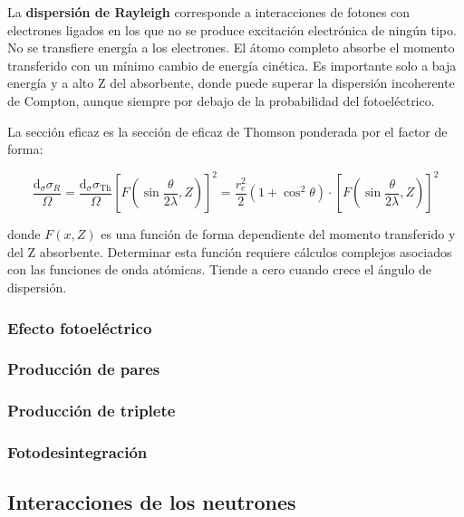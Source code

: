 La \textbf{dispersión de Rayleigh} corresponde a interacciones de fotones con electrones ligados en los que no se produce excitación electrónica de ningún tipo. No se transfiere energía a los electrones. El átomo completo absorbe el momento transferido con un mínimo cambio de energía cinética. Es importante solo a baja energía y a alto Z del absorbente, donde puede superar la dispersión incoherente de Compton, aunque siempre por debajo de la probabilidad del fotoeléctrico. 

La sección eficaz es la sección de eficaz de Thomson ponderada por el factor de forma: 

\begin{equation}
\frac{\mathrm{d}_\sigma \sigma_R}{\Omega} = \frac{\mathrm{d}_\sigma \sigma_{\text{Th}}}{\Omega} \left[ F\left( \sin\frac{\theta}{2\lambda}, Z \right) \right]^2 = \frac{r_e^2}{2}(1 + \cos^2\theta) \cdot \left[ F\left( \sin\frac{\theta}{2\lambda}, Z \right) \right]^2
\end{equation}

donde $F(x,Z)$ es una función de forma dependiente del momento transferido y del Z absorbente. Determinar esta función requiere cálculos complejos asociados con las funciones de onda atómicas. Tiende a cero cuando crece el ángulo de dispersión.
\subsubsection{Efecto fotoeléctrico}

\subsubsection{Producción de pares}

\subsubsection{Producción de triplete}

\subsubsection{Fotodesintegración}



\subsection{Interacciones de los neutrones}



